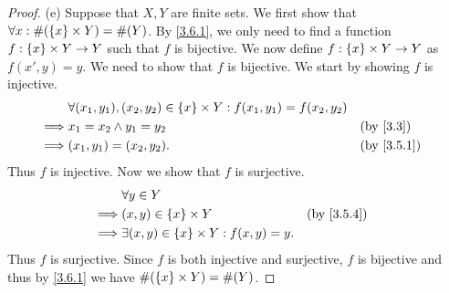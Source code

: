 \begin{proof}{(e)}
	Suppose that \(X, Y\) are finite sets.
	We first show that \(\forall x : \#(\left\lbrace x\right\rbrace \times Y) = \#(Y)\).
	By \cref{3.6.1}, we only need to find a function \(f : \left\lbrace x\right\rbrace \times Y \to Y\) such that \(f\) is bijective.
	We now define \(f : \left\lbrace x\right\rbrace \times Y \to Y\) as \(f(x', y) = y\).
	We need to show that \(f\) is bijective.
	We start by showing \(f\) is injective.
	\begin{align*}
		         & \forall (x_1, y_1), (x_2, y_2) \in \set{x} \times Y : f(x_1, y_1) = f(x_2, y_2)                 \\
		\implies & x_1 = x_2 \land y_1 = y_2                                                       &  & \by{3.3}   \\
		\implies & (x_1, y_1) = (x_2, y_2).                                                        &  & \by{3.5.1}
	\end{align*}
	Thus \(f\) is injective.
	Now we show that \(f\) is surjective.
	\begin{align*}
		         & \forall y \in Y                                                    \\
		\implies & (x, y) \in \set{x} \times Y                        &  & \by{3.5.4} \\
		\implies & \exists (x, y) \in \set{x} \times Y : f(x, y) = y.
	\end{align*}
	Thus \(f\) is surjective.
	Since \(f\) is both injective and surjective, \(f\) is bijective and thus by \cref{3.6.1} we have \(\#(\left\lbrace x\right\rbrace \times Y) = \#(Y)\).


\end{proof}
